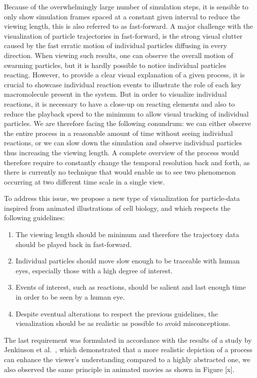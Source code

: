 Because of the overwhelmingly large number of simulation steps, it is sensible to only show simulation frames spaced at a constant given interval to reduce the viewing length, this is also referred to as fast-forward.
A major challenge with the visualization of particle trajectories in fast-forward, is the strong visual clutter caused by the fast erratic motion of individual particles diffusing in every direction.
When viewing such results, one can observe the overall motion of swarming particles, but it is hardly possible to notice individual particles reacting.
However, to provide a clear visual explanation of a given process, it is crucial to showcase individual reaction events to illustrate the role of each key macromolecule present in the system.
But in order to visualize individual reactions, it is necessary to have a close-up on reacting elements and also to reduce the playback speed to the minimum to allow visual tracking of individual particles.
We are therefore facing the following conundrum: we can either observe the entire process in a reasonable amount of time without seeing individual reactions, or we can slow down the simulation and observe individual particles thus increasing the viewing length.
A complete overview of the process would therefore require to constantly change the temporal resolution back and forth, as there is currently no technique that would enable us to see two phenomenon occurring at two different time scale in a single view.

To address this issue, we propose a new type of visualization for particle-data inspired from animated illustrations of cell biology, and which respects the following guidelines:
\begin{enumerate}
	\item The viewing length should be minimum and therefore the trajectory data should be played back in fast-forward.	
	\item Individual particles should move slow enough to be traceable with human eyes, especially those with a high degree of interest.	
	\item Events of interest, such as reactions, should be salient and last enough time in order to be seen by a human eye.	
	\item Despite eventual alterations to respect the previous guidelines, the visualization should be as realistic as possible to avoid misconceptions.
\end{enumerate}

The last requirement was formulated in accordance with the results of a study by Jenkinson et al.~\cite{jenkinson2012visualizing}, which demonstrated that a more realistic depiction of a process can enhance the viewer’s understanding compared to a highly abstracted one, we also observed the same principle in animated movies as shown in Figure [x].

